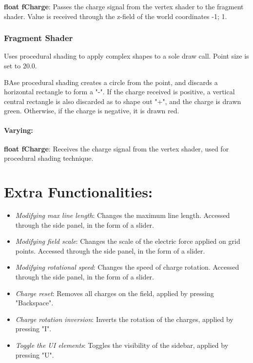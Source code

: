 \documentclass[10pt]{report}
\begin{document}
\textbf{float fCharge}: Passes the charge signal from the vertex shader to the fragment shader. Value is received through the z-field of the world coordinates {-1; 1}.

\subsection{Fragment Shader}

Uses procedural shading to apply complex shapes to a sole draw call. Point size is set to $20.0$.

BAse procedural shading creates a circle from the point, and discards a horizontal rectangle to form a "-".
If the charge received is positive, a vertical central rectangle is also discarded as to shape out "+", and the charge is drawn green.
Otherwise, if the charge is negative, it is drawn red.

\subsubsection{Varying:}

\textbf{float fCharge}: Receives the charge signal from the vertex shader, used for procedural shading technique.

\chapter{Extra Functionalities:}

\begin{itemize}
    \item \emph{Modifying max line length}: Changes the maximum line length. Accessed through the side panel, in the form of a slider.
    \item \emph{Modifying field scale}: Changes the scale of the electric force applied on grid points. Accessed through the side panel, in the form of a slider.
    \item \emph{Modifying rotational speed}: Changes the speed of charge rotation. Accessed through the side panel, in the form of a slider.
    \item \emph{Charge reset}: Removes all charges on the field, applied by pressing "Backspace".
    \item \emph{Charge rotation inversion}: Inverts the rotation of the charges, applied by pressing "I".
    \item \emph{Toggle the UI elements}: Toggles the visibility of the sidebar, applied by pressing "U".
\end{itemize}
\end{document}
